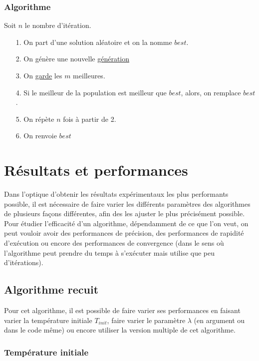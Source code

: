 \documentclass[11pt,french]{report}
\begin{document}
	\subsubsection{Algorithme}
	Soit $n$ le nombre d'itération.
	
	\begin{itemize}
		\item[1.] On part d'une solution aléatoire et on la nomme $best$.
		\item[2.] On génère une nouvelle \hyperref[Génération]{génération}
		\item[3.] On \hyperref[sélection]{garde} les $m$ meilleures.
		\item[4.] Si le meilleur de la population est meilleur que $best$, alors, on remplace $best$.
		\item[5.] On répète $n$ fois à partir de 2.
		\item[6.] On renvoie $best$
	\end{itemize}
	
	
	\section{Résultats et performances}

        Dans l'optique d'obtenir les résultats expérimentaux les plus performants possible, il est nécessaire de faire varier les différents paramètres des algorithmes de plusieurs façons différentes, afin des les ajuster le plus précisément possible. Pour étudier l'efficacité d'un algorithme, dépendamment de ce que l'on veut, on peut vouloir avoir des performances de précision, des performances de rapidité d'exécution ou encore des performances de convergence (dans le sens où l'algorithme peut prendre du temps à s'exécuter mais utilise que peu d'itérations).


        \subsection{Algorithme recuit}

        Pour cet algorithme, il est possible de faire varier ses performances en faisant varier la température initiale $T_{init}$, faire varier le paramètre $\lambda$ (en argument ou dans le code même) ou encore utiliser la version multiple de cet algorithme.

        \subsubsection{Température initiale}
        
\end{document}
